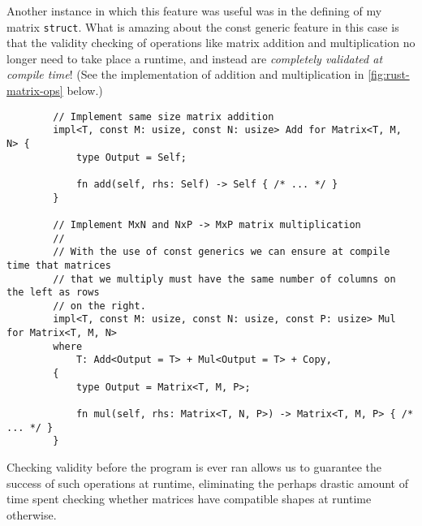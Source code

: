 \documentclass{report}
\newenvironment{code}{\captionsetup{type=listing}}{}
\begin{document}
Another instance in which this feature was useful was in the defining of my
matrix \Verb+struct+. What is amazing about the const generic feature in this
case is that the validity checking of operations like matrix addition and
multiplication no longer need to take place a runtime, and instead are
\emph{completely validated at compile time}! (See the implementation of addition
and multiplication in \cref{fig:rust-matrix-ops} below.)
\begin{code}
    \begin{verbatim}
        // Implement same size matrix addition
        impl<T, const M: usize, const N: usize> Add for Matrix<T, M, N> {
            type Output = Self;

            fn add(self, rhs: Self) -> Self { /* ... */ }
        }

        // Implement MxN and NxP -> MxP matrix multiplication
        //
        // With the use of const generics we can ensure at compile time that matrices
        // that we multiply must have the same number of columns on the left as rows
        // on the right.
        impl<T, const M: usize, const N: usize, const P: usize> Mul for Matrix<T, M, N>
        where
            T: Add<Output = T> + Mul<Output = T> + Copy,
        {
            type Output = Matrix<T, M, P>;

            fn mul(self, rhs: Matrix<T, N, P>) -> Matrix<T, M, P> { /* ... */ }
        }
    \end{verbatim}
    \caption{%
        Excerpt of my implementation of matrices in Rust,
        using traits and the const generic feature.
    }
    \label{fig:rust-matrix-ops}
\end{code}
\noindent
Checking validity before the program is ever ran allows us to guarantee the
success of such operations at runtime, eliminating the perhaps drastic amount of
time spent checking whether matrices have compatible shapes at runtime
otherwise.
\end{document}
